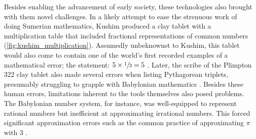 Besides enabling the advancement of early society, these technologies also brought with them novel challenges. 
In a likely attempt to ease the strenuous work of doing Sumerian mathematics, Kushim produced a clay tablet with a multiplication table that included fractional representations of common numbers (\cref{fig:kushim_multiplication}). Assumedly unbeknownst to Kushim, this tablet would also come to contain one of the world's first recorded examples of a mathematical error; the statement: $5 \times \sfrac{1}{2} = 5$ \parencite{nissen_archaic_1993}. 
Later, the scribe of the Plimpton 322 clay tablet also made several errors when listing Pythagorean triplets, presumably struggling to grapple with Babylonian mathematics \parencite{neugebauer_mathematical_1945,britton_plimpton_2011,cuneiformdigitallibraryinitiativecdli_mct_2005}. 
Besides these human errors, limitations inherent to the tools themselves also posed problems. 
The Babylonian number system, for instance, was well-equipped to represent rational numbers but inefficient at approximating irrational numbers. 
This forced significant approximation errors such as the common practice of approximating $\pi$ with 3 \parencite{georges_universal_2001}. 



